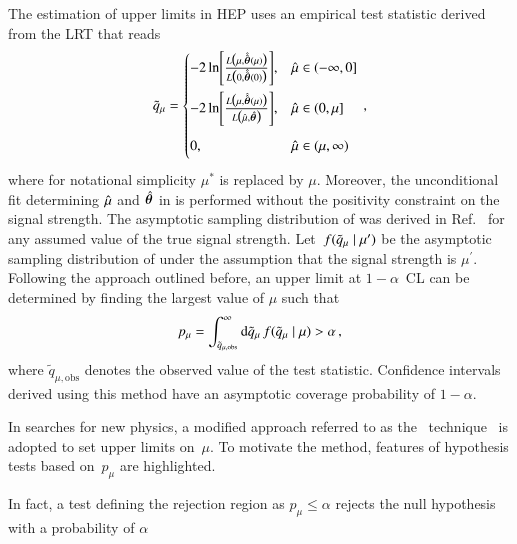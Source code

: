 The estimation of upper limits in HEP uses an empirical test statistic derived
from the LRT that reads~\cite{Cowan:2010js}
\begin{align}
  \tilde{q}_{\mu} =
  \begin{cases}
    -2\ln\mathopen{}\left[ \frac{ L\bigl( \mu, \hat{\hat{\bm{\theta}}}(\mu) \bigr)}{L\bigl( 0, \hat{\hat{\bm{\theta}}}(0) \bigr)} \right]\mathclose{}, & \hat{\mu} \in (-\infty, 0] \\[1em]
    -2\ln\mathopen{}\left[ \frac{ L\bigl( \mu, \hat{\hat{\bm{\theta}}}(\mu) \bigr)}{L\bigl( \hat{\mu}, \hat{\bm{\theta}} \bigr)} \right]\mathclose{}, & \hat{\mu} \in (0, \mu] \\[1em]
    0,\phantom{ \biggl[  \biggr]} & \hat{\mu} \in (\mu, \infty) \\
  \end{cases} \,\text{,}
  \label{eq:qmutilde}
\end{align}
where for notational simplicity $\mu^*$ is replaced by $\mu$. Moreover, the
unconditional fit determining $\hat{\mu}$ and $\hat{\bm{\theta}}$ in
 is performed without the positivity constraint on the signal
strength. The asymptotic sampling distribution of \qmutilde was derived in
Ref.~\cite{Cowan:2010js} for any assumed value of the true signal strength.
Let~$f(\tilde{q}_{\mu} \mid \mu^\prime)$ be the asymptotic sampling distribution of
\qmutilde under the assumption that the signal strength is
$\mu^\prime$. Following the approach outlined before, an upper limit at
$1 - \alpha$~CL can be determined by finding the largest value of $\mu$ such
that
\begin{align*}
  p_\mu = \int_{\tilde{q}_{\mu, \text{obs}}}^{\infty} \mathrm{d}\tilde{q}_{\mu} \, f(\tilde{q}_{\mu} \mid \mu) > \alpha \,\text{,}
\end{align*}
where $\tilde{q}_{\mu, \text{obs}}$ denotes the observed value of the test
statistic. Confidence intervals derived using this method have an asymptotic
coverage probability of $1 - \alpha$.

In searches for new physics, a modified approach referred to as the
\CLs~technique~\cite{Junk:1999kv,Read:2000ru,Read:2002hq} is adopted to set
upper limits on~$\mu$. To motivate the \CLs method, features of hypothesis tests
based on~$p_\mu$ are highlighted.






In fact, a test defining the rejection region as $p_\mu \leq \alpha$ rejects the
null hypothesis with a probability of $\alpha$


